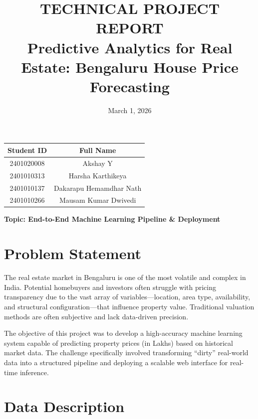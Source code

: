 \documentclass[12pt,a4paper]{article}
\title{\textbf{TECHNICAL PROJECT REPORT}\\
Predictive Analytics for Real Estate: Bengaluru House Price Forecasting}
\date{March 1, 2026}
\begin{document}
\maketitle
\thispagestyle{empty}

\vspace{1cm}

\begin{center}
\begin{tabular}{|c|c|}
\hline
\textbf{Student ID} & \textbf{Full Name} \\
\hline
2401020008 & Akshay Y \\
2401010313 & Harsha Karthikeya \\
2401010137 & Dakarapu Hemamdhar Nath \\
2401010266 & Mausam Kumar Dwivedi \\
\hline
\end{tabular}
\end{center}

\vspace{1cm}

\begin{center}
\textbf{Topic: End-to-End Machine Learning Pipeline \& Deployment}
\end{center}

\newpage


\section{Problem Statement}

The real estate market in Bengaluru is one of the most volatile and complex in India. Potential homebuyers and investors often struggle with pricing transparency due to the vast array of variables—location, area type, availability, and structural configuration—that influence property value. Traditional valuation methods are often subjective and lack data-driven precision.

The objective of this project was to develop a high-accuracy machine learning system capable of predicting property prices (in Lakhs) based on historical market data. The challenge specifically involved transforming ``dirty'' real-world data into a structured pipeline and deploying a scalable web interface for real-time inference.


\section{Data Description}
\end{document}
